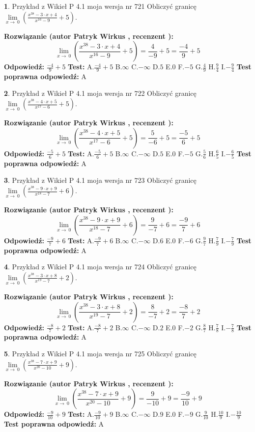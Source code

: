 \documentclass[12pt, a4paper]{article}
\theoremstyle{definition} %
\newtheorem{zad}{}
\newcommand{\zadStart}[1]{\begin{zad}#1\newline}
\newcommand{\zadStop}{\end{zad}}
\newcommand{\rozwStart}[2]{\noindent \textbf{Rozwiązanie (autor #1 , recenzent #2): }\newline}
\newcommand{\rozwStop}{\newline}
\newcommand{\odpStart}{\noindent \textbf{Odpowiedź:}\newline}
\newcommand{\odpStop}{\newline}
\newcommand{\testStart}{\noindent \textbf{Test:}\newline}
\newcommand{\testStop}{\newline}
\newcommand{\kluczStart}{\noindent \textbf{Test poprawna odpowiedź:}\newline}
\newcommand{\kluczStop}{\newline}
\begin{document}
\zadStart{Przykład z Wikieł P 4.1 moja wersja nr 721}
Obliczyć granicę $\lim\limits_{x\to\ 0}(\frac{x^{38}-3 \cdot x +4}{x^{16}-9}+5)$.
\zadStop
\rozwStart{Patryk Wirkus}{}
$$\lim\limits_{x\to\ 0}(\frac{x^{38}-3 \cdot x +4}{x^{16}-9}+5)=\frac{4}{-9}+5=\frac{-4}{9}+5$$
\rozwStop
\odpStart
$\frac{-4}{9}+5$
\odpStop
\testStart
A.$\frac{-4}{9}+5$
B.$\infty$
C.$-\infty$
D.$5$
E.$0$
F.$-5$
G.$\frac{4}{9}$
H.$\frac{9}{4}$
I.$-\frac{9}{4}$
\testStop
\kluczStart
A
\kluczStop



\zadStart{Przykład z Wikieł P 4.1 moja wersja nr 722}
Obliczyć granicę $\lim\limits_{x\to\ 0}(\frac{x^{38}-4 \cdot x +5}{x^{17}-6}+5)$.
\zadStop
\rozwStart{Patryk Wirkus}{}
$$\lim\limits_{x\to\ 0}(\frac{x^{38}-4 \cdot x +5}{x^{17}-6}+5)=\frac{5}{-6}+5=\frac{-5}{6}+5$$
\rozwStop
\odpStart
$\frac{-5}{6}+5$
\odpStop
\testStart
A.$\frac{-5}{6}+5$
B.$\infty$
C.$-\infty$
D.$5$
E.$0$
F.$-5$
G.$\frac{5}{6}$
H.$\frac{6}{5}$
I.$-\frac{6}{5}$
\testStop
\kluczStart
A
\kluczStop



\zadStart{Przykład z Wikieł P 4.1 moja wersja nr 723}
Obliczyć granicę $\lim\limits_{x\to\ 0}(\frac{x^{38}-9 \cdot x +9}{x^{18}-7}+6)$.
\zadStop
\rozwStart{Patryk Wirkus}{}
$$\lim\limits_{x\to\ 0}(\frac{x^{38}-9 \cdot x +9}{x^{18}-7}+6)=\frac{9}{-7}+6=\frac{-9}{7}+6$$
\rozwStop
\odpStart
$\frac{-9}{7}+6$
\odpStop
\testStart
A.$\frac{-9}{7}+6$
B.$\infty$
C.$-\infty$
D.$6$
E.$0$
F.$-6$
G.$\frac{9}{7}$
H.$\frac{7}{9}$
I.$-\frac{7}{9}$
\testStop
\kluczStart
A
\kluczStop



\zadStart{Przykład z Wikieł P 4.1 moja wersja nr 724}
Obliczyć granicę $\lim\limits_{x\to\ 0}(\frac{x^{38}-3 \cdot x +8}{x^{19}-7}+2)$.
\zadStop
\rozwStart{Patryk Wirkus}{}
$$\lim\limits_{x\to\ 0}(\frac{x^{38}-3 \cdot x +8}{x^{19}-7}+2)=\frac{8}{-7}+2=\frac{-8}{7}+2$$
\rozwStop
\odpStart
$\frac{-8}{7}+2$
\odpStop
\testStart
A.$\frac{-8}{7}+2$
B.$\infty$
C.$-\infty$
D.$2$
E.$0$
F.$-2$
G.$\frac{8}{7}$
H.$\frac{7}{8}$
I.$-\frac{7}{8}$
\testStop
\kluczStart
A
\kluczStop



\zadStart{Przykład z Wikieł P 4.1 moja wersja nr 725}
Obliczyć granicę $\lim\limits_{x\to\ 0}(\frac{x^{38}-7 \cdot x +9}{x^{20}-10}+9)$.
\zadStop
\rozwStart{Patryk Wirkus}{}
$$\lim\limits_{x\to\ 0}(\frac{x^{38}-7 \cdot x +9}{x^{20}-10}+9)=\frac{9}{-10}+9=\frac{-9}{10}+9$$
\rozwStop
\odpStart
$\frac{-9}{10}+9$
\odpStop
\testStart
A.$\frac{-9}{10}+9$
B.$\infty$
C.$-\infty$
D.$9$
E.$0$
F.$-9$
G.$\frac{9}{10}$
H.$\frac{10}{9}$
I.$-\frac{10}{9}$
\testStop
\kluczStart
A
\kluczStop
\end{document}
